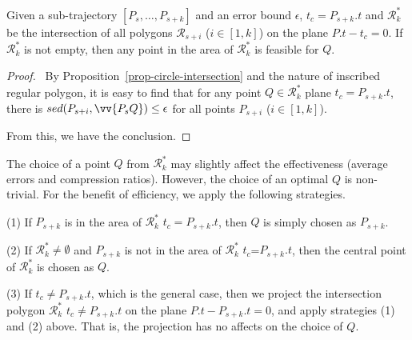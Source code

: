 \begin{prop}
\label{prop-cist-Q}
Given a sub-trajectory ${[P_s, \ldots, P_{s+k}]}$ and an error bound $\epsilon$,  $t_c=P_{s+k}.t$ and $\mathcal{R}^*_k$ be the intersection of all polygons $\mathcal{R}_{s+i}$ ($i\in[1,k]$) on the plane $P.t - t_c = 0$. If $\mathcal{R}^*_k$ is not empty, then any point in the area of $\mathcal{R}^*_k$ is feasible for $Q$.
\end{prop}

\begin{proof}\
By Proposition~\ref{prop-circle-intersection} and the nature of inscribed regular polygon, it is easy to find that for any point $Q \in \mathcal{R}^*_k$  \wrt plane $t_c=P_{s+k}.t$, there is $sed(P_{s+i}, \vv{P_sQ})\le \epsilon$ for all points $P_{s+i}$ ($i \in [1,k]$).

From this, we have the conclusion. \eop
\end{proof}

The choice of a point $Q$ from $\mathcal{R}^*_k$ may slightly affect the effectiveness (\eg average errors and compression ratios). However, the choice of an optimal $Q$ is non-trivial. For the benefit of efficiency, we apply the following strategies.

\sstab (1) If $P_{s+k}$ is in the area of $\mathcal{R}^*_k$ \wrt $t_c=P_{s+k}.t$, then $Q$ is simply chosen as $P_{s+k}$.

\sstab (2) If $\mathcal{R}^*_k \ne \emptyset$ and $P_{s+k}$ is not in the area of $\mathcal{R}^*_k$ \wrt $t_c$=$P_{s+k}.t$, then the central point of $\mathcal{R}^*_k$ is chosen as $Q$.

\sstab (3)  If $t_c \ne P_{s+k}.t$, which is the general case, then we project the intersection polygon $\mathcal{R}^*_k$ \wrt $t_c \ne P_{s+k}.t$ on the plane $P.t -P_{s+k}.t = 0$, and apply strategies (1) and (2) above. That is, the projection has no affects on the choice of $Q$.

